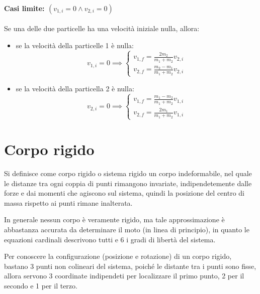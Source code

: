 \documentclass[11pt, a4paper, openright]{book}
\theoremstyle{plain}
\theoremstyle{definition}
\begin{document}
\subsubsection{Casi limite: $(v_{1, i} = 0 \wedge v_{2, i} = 0)$}
Se una delle due particelle ha una velocità iniziale nulla, allora:

\begin{itemize}
    \item se la velocità della particelle 1 è nulla:
        \begin{equation}
            v_{1, i} = 0 \implies
            \begin{cases}
                \displaystyle v_{1, f} = \frac{2m_2}{m_1 + m_2}v_{2, i} \\
                \displaystyle v_{2, f} = \frac{m_2 - m_1}{m_1 + m_2}v_{2, i}
            \end{cases}
        \end{equation}
    \item se la velocità della particella 2 è nulla:
        \begin{equation}
            v_{2, i} = 0 \implies
            \begin{cases}
                \displaystyle v_{1, f} = \frac{m_1 - m_2}{m_1 + m_2}v_{1, i} \\
                \displaystyle v_{2, f} = \frac{2m_1}{m_1 + m_2}v_{1, i}
            \end{cases}
        \end{equation}
\end{itemize}

\chapter{Corpo rigido}
Si definisce come corpo rigido o sistema rigido un corpo indeformabile, nel quale le distanze tra ogni coppia di punti rimangono invariate, indipendetemente dalle forze e dai momenti che agiscono sul sistema, quindi la posizione del centro di massa rispetto ai punti rimane inalterata.

In generale nessun corpo è veramente rigido, ma tale approssimazione è abbastanza accurata da determinare il moto (in linea di principio), in quanto le equazioni cardinali descrivono tutti e 6 i gradi di libertà del sistema.

Per conoscere la configurazione (posizione e rotazione) di un corpo rigido, bastano 3 punti non colineari del sistema, poiché le distante tra i punti sono fisse, allora servono 3 coordinate indipendeti per localizzare  il primo punto, 2 per il secondo e 1 per il terzo.
\end{document}
